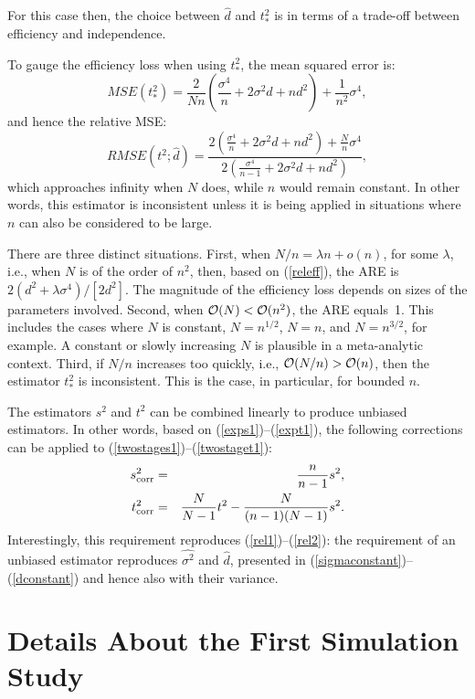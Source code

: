 \documentclass[11pt,a5paper,twoside]{book}
\begin{document}
{For this case then, the choice between $\widehat{d}$ and $t^2_\ast$ 
is in terms of a trade-off between efficiency and independence.

To gauge the efficiency loss when using $t^2_\ast$, the mean 
squared error is:
$$MSE(t^2_\ast)=\frac{2}{Nn}\left(\frac{\sigma^4}{n}+2\sigma^2d+nd^2\right)+\frac{1}{n^2}\sigma^4,$$
and hence the relative MSE:
\begin{equation}
\label{releff}
RMSE(t^2;\widehat{d})=\frac
{
2\left(\frac{\sigma^4}{n}+2\sigma^2d+nd^2\right)+\frac{N}{n}\sigma^4
}
{
2\left(\frac{\sigma^4}{n-1}+2\sigma^2d+nd^2\right)
},
\end{equation}
which approaches infinity when $N$ does, while $n$ would 
remain constant. In other words, this estimator is inconsistent 
unless it is being applied in situations where $n$ can also be considered 
to be large.

There are three distinct situations. First, when $N/n=\lambda n+o(n)$, 
for some $\lambda$, i.e., when $N$ is of the order of $n^2$, then, 
based on (\ref{releff}), the ARE is $2(d^2+\lambda\sigma^4)/[2d^2]$. 
The magnitude of the efficiency loss depends on sizes of the parameters involved. 
Second, when ${\cal O}(N)<{\cal O}(n^2)$, the ARE equals~1. This includes 
the cases where $N$ is constant, $N=n^{1/2}$, $N=n$, and $N=n^{3/2}$, for 
example. A constant or slowly increasing $N$ is plausible in a meta-analytic 
context. Third,  if $N/n$ increases too quickly, i.e., 
${\cal O}(N/n)>{\cal O}(n)$, then the estimator $t^2_\ast$ is inconsistent. 
This is the case, in particular, for bounded $n$.

The estimators $s^2$ and $t^2$ can be combined 
linearly to produce unbiased estimators. In other words, 
based on (\ref{exps1})--(\ref{expt1}), the following 
corrections can be applied to (\ref{twostages1})--(\ref{twostaget1}):
\begin{eqnarray}
s^2_{\mbox{\scriptsize corr}}&=&\frac{n}{n-1}s^2,\\
t^2_{\mbox{\scriptsize corr}}&=&\frac{N}{N-1}t^2-\frac{N}{(n-1)(N-1)}s^2.
\end{eqnarray}
Interestingly, this requirement reproduces (\ref{rel1})--(\ref{rel2}): 
the requirement of an unbiased estimator reproduces $\widehat{\sigma^2}$ 
and $\widehat{d}$, presented in
(\ref{sigmaconstant})--(\ref{dconstant}) and hence also with their variance.




\section{Details About the First Simulation Study}
\label{simapp}

}
\end{document}
